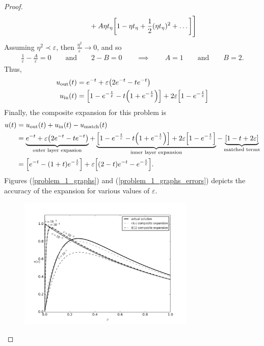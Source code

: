 \documentclass{article} %
\theoremstyle{plain}
\newcommand{\E}{\varepsilon}
\numberwithin{equation}{section} %
\numberwithin{figure}{section} %
\numberwithin{table}{section} %
\begin{document}
\begin{proof}
\begin{align*}
        &\qquad \qquad + A\eta t_\eta\qty[1 - \eta t_\eta + \frac{1}{2} (\eta t_\eta)^2 + \dots]\Bigg]
    \end{align*}
    Assuming $\eta^2 \prec \E$, then $\frac{\eta^2}{\E} \rightarrow 0$, and so
    \begin{align*}
        \frac{1}{\E} - \frac{A}{\E} = 0 \qquad \text{and} \qquad 2 - B = 0 \qquad \implies \qquad A = 1 \qquad \text{and} \qquad B = 2.
    \end{align*}
    Thus,
    \begin{align*}
        u_{\text{out}}(t) &= e^{-t} + \E\qty(2e^{-t} - te^{-t}) \\
        u_{\text{in}}(t) &= \qty[1 - e^{-\frac{t}{\E}} - t\qty(1 + e^{-\frac{t}{\E}})] + 2\E\qty[1 - e^{-\frac{t}{\E}}]
    \end{align*}
    Finally, the composite expansion for this problem is
    \begin{align*}
        u(t) &= u_{\text{out}}(t) + u_{\text{in}}(t) - u_{\text{match}}(t) \\
        &= \underbrace{e^{-t} + \E\qty(2e^{-t} - te^{-t})}_{\text{outer layer expasion}} + \underbrace{\qty[1 - e^{-\frac{t}{\E}} - t\qty(1 + e^{-\frac{t}{\E}})] + 2\E\qty[1 - e^{-\frac{t}{\E}}]}_{\text{inner layer expansion}} - \underbrace{\qty[1 - t + 2\E]}_{\text{matched terms}}\\
        &= \qty[e^{-t} - (1 + t)e^{-\frac{t}{\E}}] + \E\qty[(2 - t)e^{-t} - e^{-\frac{t}{\E}}].
    \end{align*}
    Figures (\ref{problem_1_graphs}) and (\ref{problem_1_graphs_errors}) depicts the accuracy of the expansion for various values of $\E$.
    \begin{figure}
        \centering
        \includegraphics[width=0.75\textwidth]{standard.png}\vspace{-0.22cm}

\end{figure}
\end{proof}
\end{document}
